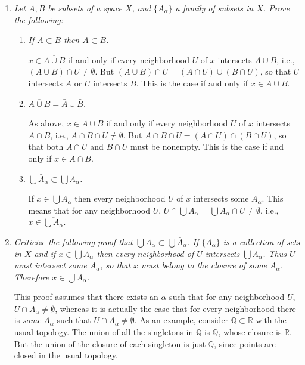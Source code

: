 \documentclass[11pt]{article}
\newcommand{\Q}{\mathbb{Q}}
\newcommand{\R}{\mathbb{R}}
\begin{document}
\begin{enumerate}
\item \emph{Let $A, B$ be subsets of a space $X$, and $\{A_\alpha\}$ a family of subsets in $X$.  Prove the following:}
\begin{enumerate}
\item \emph{If $A \subset B$ then $\bar{A} \subset \bar{B}$.}

$x \in \overline{A \cup B}$ if and only if every neighborhood $U$ of $x$ intersects $A \cup B$, i.e., $(A \cup B) \cap U \neq \emptyset$.  But $(A \cup B) \cap U = (A \cap U) \cup (B \cap U)$, so that $U$ intersects $A$ or $U$ intersects $B$.  This is the case if and only if $x \in \bar{A} \cup \bar{B}$.

\item \emph{$\overline{A \cup B} = \bar{A} \cup \bar{B}$.}

As above, $x \in \overline{A \cup B}$ if and only if every neighborhood $U$ of $x$ intersects $A \cap B$, i.e., $A \cap B \cap U \neq \emptyset$.  But $A \cap B \cap U = (A \cap U) \cap (B \cap U)$, so that both $A \cap U$ and $B \cap U$ must be nonempty.  This is the case if and only if $x \in \bar{A} \cap \bar{B}$.

\item \emph{$\bigcup\bar{A}_\alpha \subset \overline{\bigcup A_\alpha}$.}

If $x \in \bigcup\bar{A}_\alpha$ then every neighborhood $U$ of $x$ intersects some $A_\alpha$.  This means that for any neighborhood $U$, $U \cap \bigcup\bar{A}_\alpha =  \bigcup\bar{A}_\alpha \cap U \neq \emptyset$, i.e., $x \in \overline{\bigcup A_\alpha}$.

\end{enumerate}

\item \emph{Criticize the following proof that $\overline{\bigcup A_\alpha} \subset \bigcup\bar{A}_\alpha$.  If $\{A_\alpha\}$ is a collection of sets in $X$ and if $x \in \overline{\bigcup A_\alpha}$ then every neighborhood of $U$ intersects $\bigcup A_\alpha$.  Thus $U$ must intersect some $A_\alpha$, so that $x$ must belong to the closure of some $A_\alpha$.  Therefore $x \in \bigcup \bar{A}_\alpha$.}

This proof assumes that there exists an $\alpha$ such that for any neighborhood $U$, $U \cap A_\alpha \neq \emptyset$, whereas it is actually the case that for every neighborhood there is \emph{some} $A_\alpha$ such that $U \cap A_\alpha \neq \emptyset$.  As an example, consider $\Q \subset \R$ with the usual topology.  The union of all the singletons in $\Q$ is $\Q$, whose closure is $\R$.  But the union of the closure of each singleton is just $\Q$, since points are closed in the usual topology.


\end{enumerate}
\end{document}
